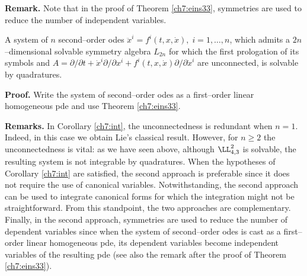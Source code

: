 {\bf Remark.} Note that in the proof of Theorem \ref{ch7:eins33}, symmetries are
used to reduce the number of independent variables.

\begin{coro}
\label{ch7:int}
\begin{em}
A system of $n$ second--order odes $\ddot x^i=f^i (t,x,\dot x),\;i=1,\ldots,n$,
which admits a $2n$--dimensional solvable symmetry algebra $L_{2n}$
for which the first prologation of its symbols and $A=\partial /\partial t+
\dot x^i\partial/\partial x^i+
f^i (t,x,\dot x)\partial /\partial \dot x^i$ are unconnected, is solvable by
quadratures.
\end{em}
\end{coro}

{\bf Proof.} Write the system of second--order odes as a first--order linear
homogeneous pde and use Theorem \ref{ch7:eins33}.

{\bf Remarks.} In Corollary \ref{ch7:int}, the unconnectedness is redundant when
$n=1$. Indeed, in this case we obtain  Lie's classical result. However, for
$n \ge 2 $ the unconnectedness is vital: as we have seen above,
although $\LL_{4,3}^2$ is solvable, the resulting system is not integrable by
quadratures. When the hypotheses of Corollary \ref{ch7:int} are satisfied, the
second approach is preferable since it does not require the use
of canonical variables. Notwithstanding, the second approach can be used to integrate
canonical forms for which the integration might not be straightforward. From
this standpoint, the two approaches are complementary. Finally, in the
second approach, symmetries are used to reduce the number of dependent
variables  since when the system of second--order odes is cast as a
first--order linear homogeneous pde, its dependent variables become independent
variables of the resulting pde (see also the  remark  after the proof
of Theorem \ref{ch7:eins33}).

